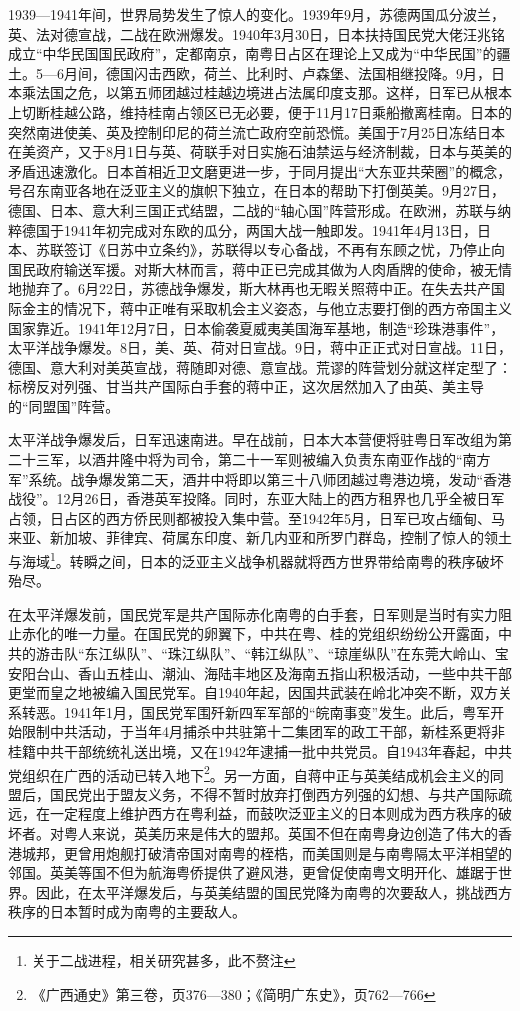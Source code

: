 1939—1941年间，世界局势发生了惊人的变化。1939年9月，苏德两国瓜分波兰，英、法对德宣战，二战在欧洲爆发。1940年3月30日，日本扶持国民党大佬汪兆铭成立“中华民国国民政府”，定都南京，南粤日占区在理论上又成为“中华民国”的疆土。5—6月间，德国闪击西欧，荷兰、比利时、卢森堡、法国相继投降。9月，日本乘法国之危，以第五师团越过桂越边境进占法属印度支那。这样，日军已从根本上切断桂越公路，维持桂南占领区已无必要，便于11月17日乘船撤离桂南。日本的突然南进使美、英及控制印尼的荷兰流亡政府空前恐慌。美国于7月25日冻结日本在美资产，又于8月1日与英、荷联手对日实施石油禁运与经济制裁，日本与英美的矛盾迅速激化。日本首相近卫文磨更进一步，于同月提出“大东亚共荣圈”的概念，号召东南亚各地在泛亚主义的旗帜下独立，在日本的帮助下打倒英美。9月27日，德国、日本、意大利三国正式结盟，二战的“轴心国”阵营形成。在欧洲，苏联与纳粹德国于1941年初完成对东欧的瓜分，两国大战一触即发。1941年4月13日，日本、苏联签订《日苏中立条约》，苏联得以专心备战，不再有东顾之忧，乃停止向国民政府输送军援。对斯大林而言，蒋中正已完成其做为人肉盾牌的使命，被无情地抛弃了。6月22日，苏德战争爆发，斯大林再也无暇关照蒋中正。在失去共产国际金主的情况下，蒋中正唯有采取机会主义姿态，与他立志要打倒的西方帝国主义国家靠近。1941年12月7日，日本偷袭夏威夷美国海军基地，制造“珍珠港事件”，太平洋战争爆发。8日，美、英、荷对日宣战。9日，蒋中正正式对日宣战。11日，德国、意大利对美英宣战，蒋随即对德、意宣战。荒谬的阵营划分就这样定型了：标榜反对列强、甘当共产国际白手套的蒋中正，这次居然加入了由英、美主导的“同盟国”阵营。

太平洋战争爆发后，日军迅速南进。早在战前，日本大本营便将驻粤日军改组为第二十三军，以酒井隆中将为司令，第二十一军则被编入负责东南亚作战的“南方军”系统。战争爆发第二天，酒井中将即以第三十八师团越过粤港边境，发动“香港战役”。12月26日，香港英军投降。同时，东亚大陆上的西方租界也几乎全被日军占领，日占区的西方侨民则都被投入集中营。至1942年5月，日军已攻占缅甸、马来亚、新加坡、菲律宾、荷属东印度、新几内亚和所罗门群岛，控制了惊人的领土与海域\footnote{关于二战进程，相关研究甚多，此不赘注}。转瞬之间，日本的泛亚主义战争机器就将西方世界带给南粤的秩序破坏殆尽。

在太平洋爆发前，国民党军是共产国际赤化南粤的白手套，日军则是当时有实力阻止赤化的唯一力量。在国民党的卵翼下，中共在粤、桂的党组织纷纷公开露面，中共的游击队“东江纵队”、“珠江纵队”、“韩江纵队”、“琼崖纵队”在东莞大岭山、宝安阳台山、香山五桂山、潮汕、海陆丰地区及海南五指山积极活动，一些中共干部更堂而皇之地被编入国民党军。自1940年起，因国共武装在岭北冲突不断，双方关系转恶。1941年1月，国民党军围歼新四军军部的“皖南事变”发生。此后，粤军开始限制中共活动，于当年4月捕杀中共驻第十二集团军的政工干部，新桂系更将非桂籍中共干部统统礼送出境，又在1942年逮捕一批中共党员。自1943年春起，中共党组织在广西的活动已转入地下\footnote{《广西通史》第三卷，页376—380；《简明广东史》，页762—766}。另一方面，自蒋中正与英美结成机会主义的同盟后，国民党出于盟友义务，不得不暂时放弃打倒西方列强的幻想、与共产国际疏远，在一定程度上维护西方在粤利益，而鼓吹泛亚主义的日本则成为西方秩序的破坏者。对粤人来说，英美历来是伟大的盟邦。英国不但在南粤身边创造了伟大的香港城邦，更曾用炮舰打破清帝国对南粤的桎梏，而美国则是与南粤隔太平洋相望的邻国。英美等国不但为航海粤侨提供了避风港，更曾促使南粤文明开化、雄踞于世界。因此，在太平洋爆发后，与英美结盟的国民党降为南粤的次要敌人，挑战西方秩序的日本暂时成为南粤的主要敌人。

